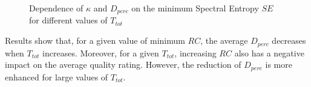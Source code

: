 \begin{figure}[!tb]
\begin{flushright}
    \hfil
\end{flushright}
\caption{Dependence of $\kappa$ and $D_{perc}$ on the minimum Spectral Entropy $SE$ for different values of $T_{tot}$}
\label{fig:NMP:minSE}
\end{figure}


Results show that, for a given value of minimum $RC$, the average $D_{perc}$ decreases when $T_{tot}$ increases. Moreover, for a given $T_{tot}$, increasing $RC$ also has a negative impact on the average quality rating. However, the reduction of $D_{perc}$ is more enhanced for large values of $T_{tot}$. 

